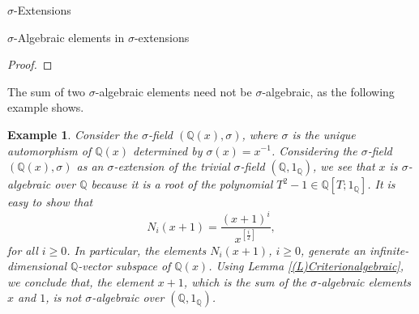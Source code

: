 \documentclass[11pt,a4paper]{article}
\theoremstyle{theorem}
\newtheorem{example}{Example}[section]
\numberwithin{equation}{section}
\newcommand{\s}{\sigma}
\begin{document}
\begin{section}{$\s$-Extensions}
\begin{subsection}{$\s$-Algebraic elements in $\s$-extensions }
\begin{proof}
	\end{proof}
	The sum of two $\s$-algebraic elements need not be  $\s$-algebraic, as the following example shows. 
	\begin{example}
		Consider the $\s$-field $(\mathbb{Q}(x),\s)$, where $\s$ is the unique automorphism of $\mathbb{Q}(x)$ determined by $\s(x)=x^{-1}$. Considering the $\s$-field $(\mathbb{Q}(x),\s)$ as an $\s$-extension  of the trivial $\s$-field $(\mathbb{Q},1_\mathbb{Q})$, we see that $x$ is $\s$-algebraic over $\mathbb{Q}$ because it is a root of the polynomial $T^2-1\in \mathbb{Q}[T;1_\mathbb{Q}]$. It is easy to show that
		$$N_i(x+1)=\frac{(x+1)^i}{x^{[\frac{i}{2}]}},$$
		for all $i\geq 0$. In particular, the elements  $N_i(x+1)$, $i\geq 0$, generate an infinite-dimensional $\mathbb{Q}$-vector subspace of $\mathbb{Q}(x)$. Using Lemma  \ref{(L)Criterionalgebraic}, 
		 we conclude that,  the element $x+1$, which is the sum of the $\s$-algebraic elements $x$ and $1$, is not $\s$-algebraic over $(\mathbb{Q},1_\mathbb{Q})$. 		  
	\end{example}	
	

\end{subsection}
\end{section}
\end{document}
